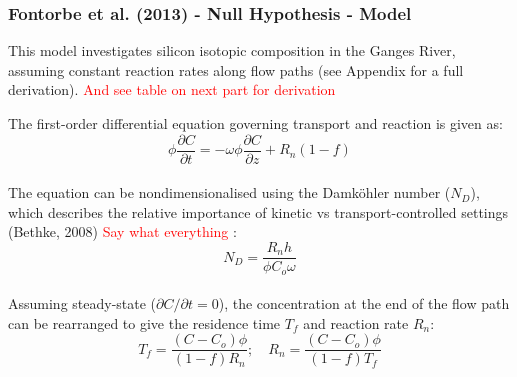 \newpage


\subsubsection{Fontorbe et al. (2013) - Null Hypothesis - Model}

This model investigates silicon isotopic composition in the Ganges River, assuming constant reaction rates along flow paths (see Appendix for a full derivation). \textcolor{red}{And see table on next part for derivation}

\bsk

The first-order differential equation governing transport and reaction is given as:\\

    \begin{equation}
    \phi \frac{\partial C}{\partial t} = -\omega \phi \frac{\partial C}{\partial z} + R_n(1-f)
    \end{equation}\\

The equation can be nondimensionalised using the Damköhler number (\(N_D\)), which describes the relative importance of kinetic vs transport-controlled settings (Bethke, 2008) \textcolor{red}{Say what everything }:\\

\begin{equation}
    N_D = \frac{R_n h}{\phi C_o \omega}
\end{equation}\\

Assuming steady-state (\(\partial C/\partial t = 0\)), the concentration at the end of the flow path can be rearranged to give the residence time \(T_f\) and reaction rate \(R_n\):\\

\begin{equation}
    T_f = \frac{(C - C_o)\phi}{(1-f)R_n}; \quad
    R_n = \frac{(C - C_o)\phi}{(1-f)T_f}
\end{equation}



\newpage

